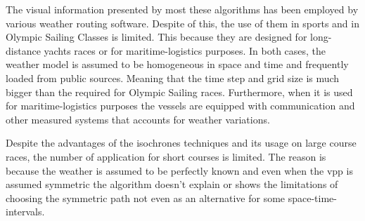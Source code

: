 The visual information presented by most these algorithms has been employed by various weather routing software. Despite of this, the use of them in sports and in Olympic Sailing Classes is limited. This because they are designed for long-distance yachts races or for maritime-logistics purposes. In both cases, the weather model is assumed to be homogeneous in space and time and frequently loaded from public sources. Meaning that the time step and grid size is much bigger than the required for Olympic Sailing races. Furthermore, when it is used for maritime-logistics purposes the vessels are equipped with communication and other measured systems that accounts for weather variations. \par
Despite the advantages of the isochrones techniques and its usage on large course races, the number of application for short courses is limited. The reason is because the weather is assumed to be perfectly known and even when the \acrshort{vpp} is assumed symmetric the algorithm doesn't explain or shows the limitations of choosing the symmetric path not even as an alternative for some space-time-intervals.\par    

